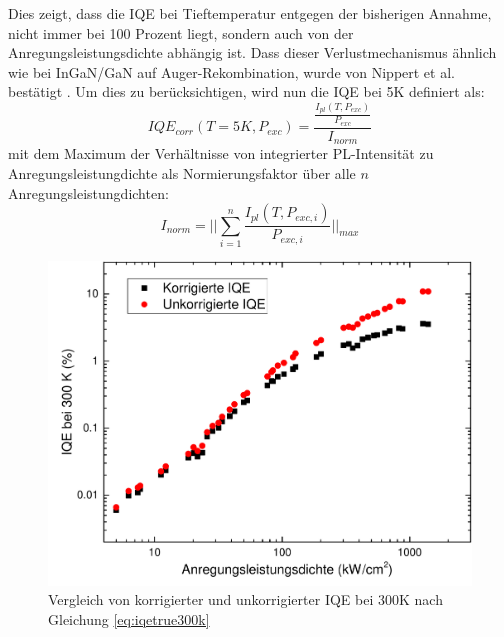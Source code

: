 \vspace{0.1cm}
\noindent
\newline
Dies zeigt, dass die IQE bei Tieftemperatur entgegen der bisherigen Annahme, nicht immer bei 100 Prozent liegt, sondern auch von der  Anregungsleistungsdichte abhängig ist. Dass dieser Verlustmechanismus ähnlich wie bei InGaN/GaN auf Auger-Rekombination, wurde von Nippert et al. bestätigt \cite{doi:10.1063/1.4965298}. 
\newline
Um dies zu berücksichtigen, wird nun die IQE bei 5K definiert als:
\begin{equation}
    IQE_{corr}(T = 5K, P_{exc}) = \frac{ \frac{I_{pl}(T,P_{exc}) }{P_{exc} } } { I_{norm}}
    \label{eq:iqetrue5k}
\end{equation}
mit dem Maximum der Verhältnisse von integrierter PL-Intensität zu Anregungsleistungdichte als  Normierungsfaktor über alle $n$ Anregungsleistungdichten:
\begin{equation}
    I_{norm} = \lvert \lvert \sum_{i=1}^{n} \frac{I_{pl}(T,P_{exc,i})}{P_{exc,i}} \lvert \lvert_{max}
    \label{eq:iplnorm}
\end{equation}
\noindent
\begin{figure}[htb]
\centering
    \begin{minipage}[t]{0.49\linewidth}
        \includegraphics[width=\linewidth]{Bilder/korrigierteIQE300K.pdf}
        \caption{Vergleich von korrigierter und unkorrigierter IQE bei 300K nach Gleichung \ref{eq:iqetrue300k} }
        \label{fig:trueiqe300k}
    \end{minipage}
\end{figure}
